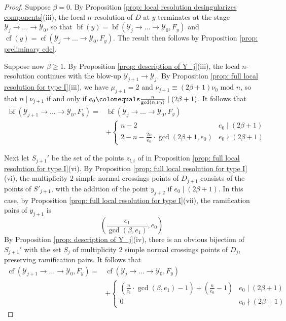 \documentclass[12pt]{amsart}
\numberwithin{equation}{section}
\theoremstyle{definition}
\newcommand{\Y}{\mathcal{Y}}
\newcommand{\tx}[1]{\text{#1}}
\DeclareMathOperator{\blf}{bf}
\DeclareMathOperator{\cf}{cf}
\begin{document}
\begin{proof}
    Suppose $\beta=0$. By Proposition \ref{prop: local resolution desingularizes components}(iii), the local $n$-resolution of $D$ at $y$ terminates at the stage $\Y_j\to...\to\Y_0$, so that $\blf(y)=\blf(\Y_j\to...\to\Y_0,F_y)$ and $\cf(y)=\cf(\Y_j\to...\to\Y_0,F_y)$. The result then follows by Proposition \ref{prop: preliminary cdc}.
    
    Suppose now $\beta\geq 1$. By Proposition \ref{prop: description of Y_j}(iii), the local $n$-resolution continues with the blow-up $\Y_{j+1}\to\Y_j$. By Proposition \ref{prop: full local resolution for type I}(iii), we have $\mu_{j+1}=2$ and $\nu_{j+1}\equiv(2\beta+1)\nu_0\tx{ mod }n$, so that $n\mid \nu_{j+1}$ if and only if $e_0\colonequals\frac{n}{\gcd(n,\nu_0)}\mid(2\beta+1)$.
    It follows that
    \begin{equation}\label{eq: Type I first bf} 
    \begin{aligned}
    \blf(\Y_{j+1}\to...\to\Y_0,F_y)=&\blf(\Y_j\to...\to\Y_0,F_y)\\
    &+
    \begin{cases}
        n-2& e_0\mid(2\beta+1)\\
        2-n-\frac{2n}{e_0}\cdot\gcd(2\beta+1,e_0)& e_0\nmid (2\beta+1)
    \end{cases}
    \end{aligned}
    \end{equation}    


    Next let $S_{j+1}'$ be the set of the points $z_{l,i}$ of in Proposition \ref{prop: full local resolution for type I}(vi). By Proposition \ref{prop: full local resolution for type I}(vi), the multiplicity $2$ simple normal crossings points of $D_{j+1}$ consists of the points of $S'_{j+1}$, with the addition of the point $y_{j+2}$ if $e_0\mid(2\beta+1)$. In this case, by Proposition \ref{prop: full local resolution for type I}(vii), the ramification pairs of $y_{j+1}$ is
    \[(\frac{e_1}{\gcd(\beta,e_1)},e_0)\]
    By Proposition \ref{prop: description of Y_j}(iv), there is an obvious bijection of $S_{j+1}'$ with the set $S_j$ of multiplicity $2$ simple normal crossings points of $D_j$, preserving ramification pairs. It follows that
    \begin{equation}\label{eq: Type I first cf}
    \begin{aligned}
    \cf(\Y_{j+1}\to...\to\Y_0,F_y)
        =&\cf(\Y_j\to...\to\Y_0,F_y)\\
        &+\begin{cases}
        (\frac{n}{e_1}\cdot\gcd(\beta,e_1)-1)+(\frac{n}{e_0}-1)&e_0\mid(2\beta+1)\\
        0&e_0\nmid(2\beta+1)
        \end{cases}
    \end{aligned}
    \end{equation}


\end{proof}
\end{document}
